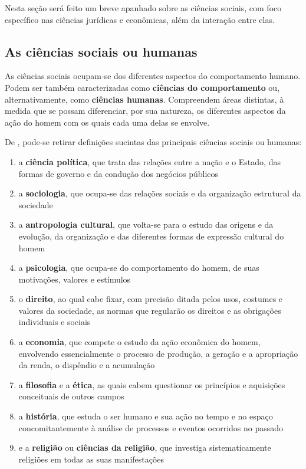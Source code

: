 \documentclass[
	10pt,				%
	openright,			%
	twoside,			%
	a5paper,			%
	english,			%
	french,				%
	spanish,			%
	brazil				%
	]{abntex2}
\renewenvironment{quote}
  {\small\list{}{\rightmargin=0.1cm \leftmargin=4cm}%
   \item\relax}
  {\endlist}
\begin{document}
Nesta seção será feito um breve apanhado sobre as ciências sociais, com
foco específico nas ciências jurídicas e econômicas, além da interação
entre elas.

\subsection{As ciências sociais ou
humanas}\label{as-ciuxeancias-sociais-ou-humanas}

\begin{quote}
As ciências sociais ocupam-se dos diferentes aspectos do comportamento
humano. Podem ser também caracterizadas como \textbf{ciências do
comportamento} ou, alternativamente, como \textbf{ciências humanas}.
Compreendem áreas distintas, à medida que se possam diferenciar, por sua
natureza, os diferentes aspectos da ação do homem com os quais cada uma
delas se envolve. \cite[p.~30]{rossetti}
\end{quote}

De , pode-se retirar definições sucintas
das principais ciências sociais ou humanas:

\begin{enumerate}
\def\labelenumi{\arabic{enumi})}
\tightlist
\item
  a \textbf{ciência política}, que trata das relações entre a nação e o
  Estado, das formas de governo e da condução dos negócios públicos
  \cite[p.~30]{rossetti}
\item
  a \textbf{sociologia}, que ocupa-se das relações sociais e da
  organização estrutural da sociedade \cite[p.~30-31]{rossetti}
\item
  a \textbf{antropologia cultural}, que volta-se para o estudo das
  origens e da evolução, da organização e das diferentes formas de
  expressão cultural do homem \cite[p.~31]{rossetti}
\item
  a \textbf{psicologia}, que ocupa-se do comportamento do homem, de suas
  motivações, valores e estímulos \cite[p.~31]{rossetti}
\item
  o \textbf{direito}, ao qual cabe fixar, com precisão ditada pelos
  usos, costumes e valores da sociedade, as normas que regularão os
  direitos e as obrigações individuais e sociais \cite[p.~31]{rossetti}
\item
  a \textbf{economia}, que compete o estudo da ação econômica do homem,
  envolvendo essencialmente o processo de produção, a geração e a
  apropriação da renda, o dispêndio e a acumulação
  \cite[p.~31]{rossetti}
\item
  a \textbf{filosofia} e a \textbf{ética}, as quais cabem questionar os
  princípios e aquisições conceituais de outros campos
  \cite[p.~31]{rossetti}
\item
  a \textbf{história}, que estuda o ser humano e sua ação no tempo e no
  espaço concomitantemente à análise de processos e eventos ocorridos no
  passado \cite{historia}
\item
  e a \textbf{religião} ou \textbf{ciências da religião}, que investiga
  sistematicamente religiões em todas as suas manifestações
  \cite{religiao}
\end{enumerate}
\end{document}

